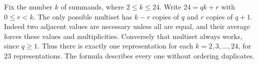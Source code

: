 Fix the number $k$ of summands, where $2\le k\le24$. Write $24=qk+r$ with $0\le r<k$. The only possible multiset has $k-r$ copies of $q$ and $r$ copies of $q+1$. Indeed two adjacent values are necessary unless all are equal, and their average forces these values and multiplicities. Conversely that multiset always works, since $q\ge1$. Thus there is exactly one representation for each $k=2,3,\ldots,24$, for $\boxed{23}$ representations. The formula describes every one without ordering duplicates.

